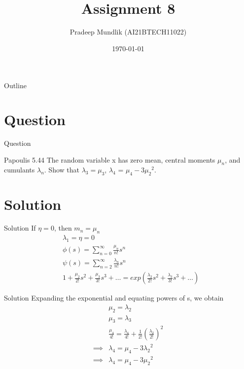\documentclass{beamer}
\title{Assignment 8}
\author{Pradeep Mundlik (AI21BTECH11022)}
\date{\today}
\begin{document}
\begin{frame}
    \titlepage 
\end{frame}



\begin{frame}{Outline}
    \tableofcontents
\end{frame}


\section{Question}
\begin{frame}{Question}
    \begin{block}{Papoulis 5.44}
        The random variable x has zero mean, central moments $\mu_n$, and cumulants $\lambda_n$. Show that $\lambda_3 = \mu_3$, $\lambda_4$ = $\mu_4 - 3{\mu_2}^2$.
    \end{block}
\end{frame}

\section{Solution}
\begin{frame}{Solution}
    If $\eta = 0$, then $m_n = \mu_n$ \\
    \begin{align}
        &\lambda_1 = \eta = 0 \\
        &\phi(s) = \sum_{n = 0}^{\infty}  \frac{\mu_n}{n!} s^n \\
        &\psi(s) = \sum_{n = 2}^{\infty} \frac{\lambda_n}{n!} s^n \\
        &1 + \frac{\mu_2}{2!}s^2 + \frac{\mu_3}{3!}s^3 + \dots = exp\left(\frac{\lambda_2}{2!} s^2 + \frac{\lambda_3}{3!}s^3 + \dots\right)
    \end{align}
\end{frame}
\begin{frame}{Solution}
    Expanding the exponential and equating powers of s, we obtain
    \begin{align}
        &\mu_2 = \lambda_2 \\
        &\mu_3 = \lambda_3 \\
        &\frac{\mu_4}{4!} = \frac{\lambda_4}{4!} + \frac{1}{2!}\left(\frac{\lambda_2}{2!}\right)^2 \\
        \implies &\lambda_4 = \mu_4 - 3{\lambda_2}^2 \\
        \implies &\lambda_4 = \mu_4 - 3{\mu_2}^2 
    \end{align}
\end{frame}
\end{document}
